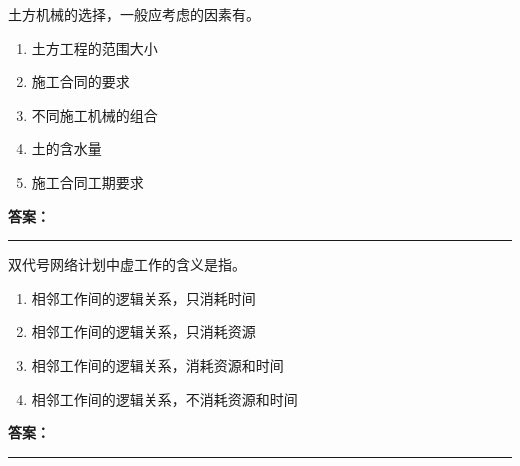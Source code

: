 \documentclass[UTF8,fontset=fandol,11pt]{ctexart}
\newcommand{\answerline}{\textcolor{answerred}{\rule{2.4cm}{0.7pt}}}
\begin{document}
\begin{quizbox}[title={乱序第 212 题｜第一章土方工程}]

土方机械的选择，一般应考虑的因素有。\\

\begin{enumerate}[label=\Alph*.]

\item 土方工程的范围大小

\item 施工合同的要求

\item 不同施工机械的组合

\item 土的含水量

\item 施工合同工期要求

\end{enumerate}

\textbf{\textcolor{answerred}{答案：}} \answerline

\end{quizbox}

\vspace{0.2em}

\begin{quizbox}[title={乱序第 213 题｜第十一章网络计划技术}]

双代号网络计划中虚工作的含义是指。\\

\begin{enumerate}[label=\Alph*.]

\item 相邻工作间的逻辑关系，只消耗时间

\item 相邻工作间的逻辑关系，只消耗资源

\item 相邻工作间的逻辑关系，消耗资源和时间

\item 相邻工作间的逻辑关系，不消耗资源和时间

\end{enumerate}

\textbf{\textcolor{answerred}{答案：}} \answerline

\end{quizbox}

\vspace{0.2em}
\end{document}
